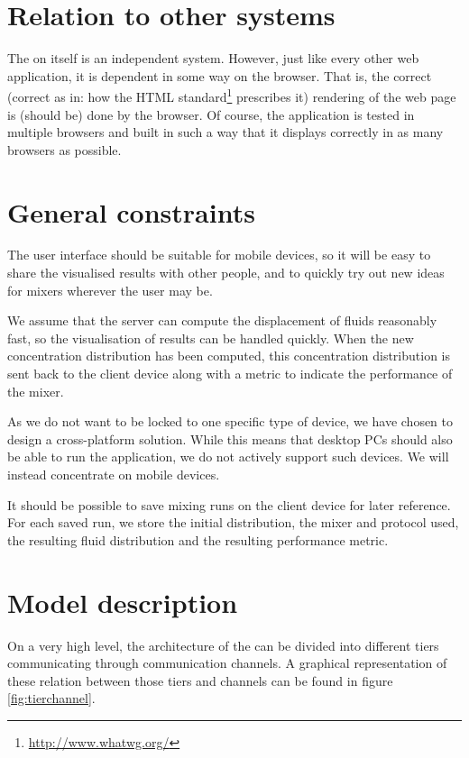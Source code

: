 \section{Relation to other systems}
\label{sec:othersys}
The \applicationname{} on itself is an independent system. However, just like every other web application, it is dependent in some way on the browser. That is, the correct (correct as in: how the HTML standard\footnote{\url{http://www.whatwg.org/}} prescribes it) rendering of the web page is (should be) done by the browser. Of course, the application is tested in multiple browsers and built in such a way that it displays correctly in as many browsers as possible.

\section{General constraints}
\label{sec:genconst}
The user interface should be suitable for mobile devices, so it will be easy to share the visualised results with other people, and to quickly try out new ideas for mixers wherever the user may be.

We assume that the server can compute the displacement of fluids reasonably fast, so the visualisation of results can be handled quickly. When the new concentration distribution has been computed, this concentration distribution is sent back to the client device along with a metric to indicate the performance of the mixer.

As we do not want to be locked to one specific type of device, we have chosen to design a cross-platform solution. While this means that desktop PCs should also be able to run the application, we do not actively support such devices. We will instead concentrate on mobile devices.

It should be possible to save mixing runs on the client device for later reference. For each saved run, we store the initial distribution, the mixer and protocol
used, the resulting fluid distribution and the resulting performance metric.

\section{Model description}
\label{sec:moddesc}
On a very high level, the architecture of the \applicationname{} can be divided into different tiers communicating through communication channels. A graphical representation of these relation between those tiers and channels can be found in figure \ref{fig:tierchannel}.

